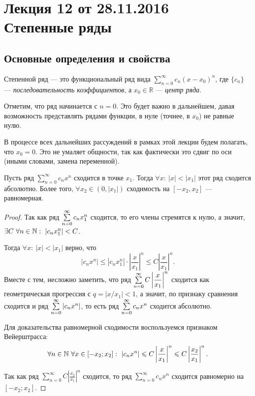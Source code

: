 \section{Лекция 12 от 28.11.2016 \\ Степенные ряды}

\subsection{Основные определения и свойства}
\begin{Def}
	Степенной ряд --- это функциональный ряд вида $\sum\limits_{n = 0}^{\infty}c_n (x-x_0)^n$, где $\{c_n\}$ --- \textit{последовательность коэффициентов}, а $x_0 \in \mathbb{R}$ ---  \textit{центр ряда}.
\end{Def}

Отметим, что ряд начинается с $n = 0$. Это будет важно в дальнейшем, давая возможность представлять рядами функции, в нуле (точнее, в $x_0$) не равные нулю.

В процессе всех дальнейших рассуждений в рамках этой лекции будем полагать, что $x_0 = 0$. Это не умаляет общности, так как фактически это сдвиг по оси (иными словами, замена переменной).

\begin{Theorem} [Абеля I]
	Пусть ряд $\sum\limits_{n = 0}^{\infty}c_n x^n$ сходится в точке $x_1$. Тогда $\forall x:\ |x| < |x_1|$ этот ряд сходится абсолютно. Более того, $\forall x_2 \in (0, |x_1|)$ сходимость на $[-x_2, x_2]$ --- равномерная.
\end{Theorem}
\begin{proof}
	Так как ряд $\sum\limits_{n=0}^{\infty} c_nx_1^n$ сходится, то его члены стремятся к нулю, а значит, $\exists C\ \forall n \in \mathbb{N}:\ |c_nx_1^n| < C$. 
	
	Тогда $\forall x:\ |x| < |x_1|$ верно, что 
	$$
	|c_nx^n| \leq |c_nx_1^n| \cdot \left| \dfrac{x}{x_1} \right|^n \leq C \left| \dfrac{x}{x_1} \right|^n.
	$$
	Вместе с тем, несложно заметить, что ряд $\sum\limits_{n=0}^{\infty} C \left|\dfrac{x}{x_1}\right|^n$ сходится как геометрическая прогрессия с $q = |x/x_1| < 1$, а значит, по признаку сравнения сходится и ряд $\sum\limits_{n=0}^{\infty} |c_nx^n|$, то есть ряд $\sum\limits_{n=0}^{\infty} c_nx^n$ сходится абсолютно.
	
	Для доказательства равномерной сходимости воспользуемся признаком Вейерштрасса:
	$$
	\forall n \in \mathbb{N}\ \forall x \in [-x_2; x_2]:\ |c_nx^n| \leqslant C\left|\frac{x}{x_1} \right|^n \leqslant C\left|\frac{x_2}{x_1}\right|^n.
	$$
	
	Так как ряд $\sum\limits_{n=0}^{\infty} C\left|\frac{x_2}{x_1} \right|^n$ сходится, то ряд $\sum\limits_{n = 0}^{\infty}c_n x^n$ сходится равномерно на $[-x_2; x_2]$.
\end{proof}


